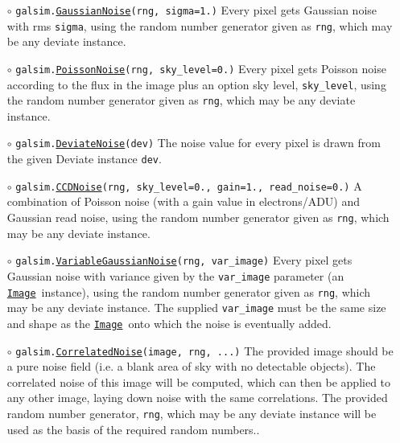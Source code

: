 \documentclass[preprint,10pt]{../../devel/modules/aastex}
\newcommand\Image{\href{http://galsim-developers.github.io/GalSim/classgalsim_1_1image_1_1_image.html}{\texttt{Image}}}
\begin{document}
\begin{itemize}
  \item[$\circ$]
  \texttt{galsim.\href{http://galsim-developers.github.io/GalSim/classgalsim_1_1_gaussian_noise.html}{GaussianNoise}(rng, sigma=1.)}
    \newline
    Every pixel gets Gaussian noise with rms \texttt{sigma}, using the
    random number generator given as \texttt{rng}, which may be any deviate instance.

  \item[$\circ$]
  \texttt{galsim.\href{http://galsim-developers.github.io/GalSim/classgalsim_1_1_poisson_noise.html}{PoissonNoise}(rng, sky\_level=0.)}
    \newline
    Every pixel gets Poisson noise according to the flux in
    the image plus an option sky level, \texttt{sky\_level}, using the
    random number generator given as \texttt{rng}, which may be any deviate instance.

  \item[$\circ$]
  \texttt{galsim.\href{http://galsim-developers.github.io/GalSim/classgalsim_1_1_deviate_noise.html}{DeviateNoise}(dev)}
    \newline
    The noise
    value for every pixel is drawn from the given Deviate instance
    \texttt{dev}.

  \item[$\circ$]
  \texttt{galsim.\href{http://galsim-developers.github.io/GalSim/classgalsim_1_1_c_c_d_noise.html}{CCDNoise}(rng, sky\_level=0., gain=1.,
    read\_noise=0.)}
    \newline
    A combination of Poisson noise (with a
    gain value in electrons/ADU) and Gaussian read noise, using the
    random number generator given as \texttt{rng}, which may be any deviate instance.

  \item[$\circ$]
  \texttt{galsim.\href{http://galsim-developers.github.io/GalSim/classgalsim_1_1noise_1_1_variable_gaussian_noise.html}{VariableGaussianNoise}(rng, var\_image)}
    \newline
    Every pixel gets Gaussian noise with variance given by the \texttt{var\_image} parameter
    (an \Image\ instance), using the
    random number generator given as \texttt{rng}, which may be any deviate instance.
    The supplied \texttt{var\_image} must be the same size and shape as the \Image\
    onto which the noise is eventually added.

  \item[$\circ$]
  \texttt{galsim.\href{http://galsim-developers.github.io/GalSim/classgalsim_1_1correlatednoise_1_1_correlated_noise.html}{CorrelatedNoise}(image, rng, ...)}
    \newline
   The provided image should be a pure noise field (i.e. a blank area of sky with no detectable
    objects).  The correlated noise of this image will be computed, which can then be applied
    to any other image, laying down noise with the same correlations.  The provided
    random number generator, \texttt{rng}, which may be any deviate instance will be used
    as the basis of the required random numbers..

\end{itemize}
\end{document}
